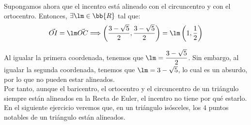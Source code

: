 \begin{ejercicio}
    Supongamos ahora que el incentro está alineado con el circuncentro y con el ortocentro. Entonces, $\exists \lm \in \bb{R}$ tal que:
    \begin{equation*}
        \vec{OI} = \lm \vec{OC} \Longrightarrow
        \left(\frac{3-\sqrt{5}}{2},\frac{3-\sqrt{5}}{2}\right) = \lm \left(1,\frac{1}{2}\right)
    \end{equation*}

    Al igualar la primera coordenada, tenemos que $\lm = \dfrac{3-\sqrt{5}}{2}$.
    Sin embargo, al igualar la segunda coordenada, tenemos que $\lm = {3-\sqrt{5}}$, lo cual es un absurdo, por lo que no pueden estar alineados.\\

    Por tanto, aunque el baricentro, el ortocentro y el circuncentro de un triángulo siempre están alineados en la Recta de Euler, el incentro no tiene por qué estarlo.
    En el siguiente ejercicio veremos que, en un triángulo isósceles, los 4 puntos notables de un triángulo están alineados.
\end{ejercicio}

